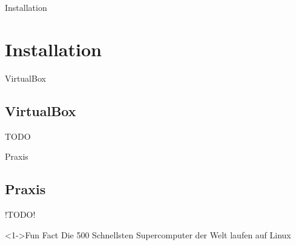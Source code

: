 
\begin{frame}{Installation}
    \section{Installation}\label{sec:installation}
\end{frame}

\begin{frame}{VirtualBox}
    \subsection{VirtualBox}\label{subsec:VirtualBox}

    TODO

\end{frame}

\begin{frame}{Praxis}
    \subsection{Praxis}\label{subsec:praxis}

    !TODO!

    \begin{exampleblock}<1->{Fun Fact}
        Die 500 Schnellsten Supercomputer der Welt laufen auf Linux
    \end{exampleblock}

\end{frame}